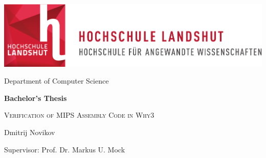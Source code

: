 \thispagestyle{empty}
\begin{titlepage}
	\vspace{3cm}

\begin{center}
	\includegraphics[scale=0.8]{include/logo.pdf}  
\end{center}

\vspace{2.5cm}

\begin{center}
  \Large Department of Computer Science
\end{center}

\vspace{1cm}
\begin{center}
	\Huge
	\textbf{Bachelor's Thesis}\\
\end{center}

\vspace{1cm}

\begin{center}
	\Large
	\textsc{Verification of MIPS Assembly Code in Why3}\\
\end{center}

\vspace{1.5cm}

\begin{center}
	\Large
	Dmitrij Novikov
\end{center}

\vspace{2cm}
\begin{center}
	\large
	Supervisor: Prof. Dr. Markus U. Mock \\
\end{center}

\vspace{2cm}
\begin{center}
	\large 
        \the\year \\
\end{center}

\end{titlepage}
